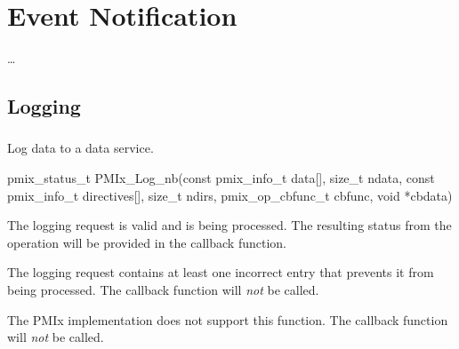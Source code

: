 \chapter{Event Notification}
\label{chap:api_event}

\ldots


\section{Logging}
\label{chap:api_event:logging}


\subsection{}

\summary

Log data to a data service.

\format

\cspecificstart
\begin{codepar}
pmix_status_t
PMIx_Log_nb(const pmix_info_t data[], size_t ndata,
            const pmix_info_t directives[], size_t ndirs,
            pmix_op_cbfunc_t cbfunc, void *cbdata)
\end{codepar}
\cspecificend

\begin{arglist}
\end{arglist}

\begin{constantdesc}
\item {} The logging request is valid and is being processed. The resulting status from the operation will be provided in the callback function.
\item {} The logging request contains at least one incorrect entry that prevents it from being processed. The callback function will \emph{not} be called.
\item {} The \ac{PMIx} implementation does not support this function. The callback function will \emph{not} be called.
\end{constantdesc}

